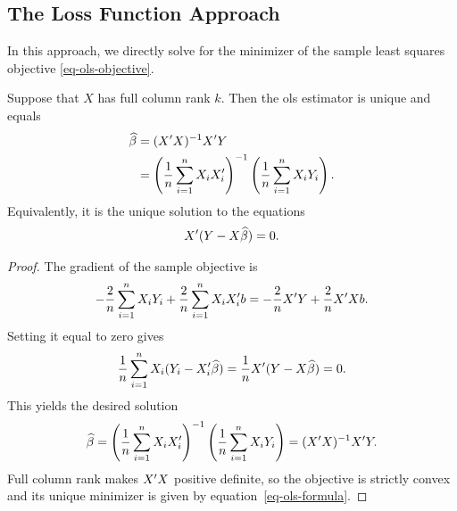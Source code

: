 \documentclass[a4paper,12pt]{article}
\begin{document}
\subsection{The Loss Function Approach}

In this approach, we directly solve for the minimizer of the sample least squares objective \eqref{eq-ols-objective}.


\begin{theorem}\label{thm-sample-least-squares}
	Suppose that $X$ has full column rank $k$.
	Then the \gls{ols} estimator is unique and equals
	\begin{align}\label{eq-ols-formula}
		\widehat\beta
		&=(X^{\prime} X)^{-1} X^{\prime} Y\\
		&=\left(\frac{1}{n}\sum_{i=1}^nX_iX_i^{\prime}\right)^{-1}
		\left(\frac{1}{n}\sum_{i=1}^nX_iY_i\right).
	\end{align}
	Equivalently, it is the unique solution to the equations
	\begin{align}\label{eq-sample-normal-equations}
		X^{\prime}(Y-X\widehat\beta)=0.
	\end{align}
\end{theorem}
\begin{proof}
	The gradient of the sample objective is
	\begin{align}
		-\frac2n \sum_{i=1}^n X_iY_i + \frac2n \sum_{i=1}^n X_iX_i^{\prime} b
		=-\frac2n X^{\prime} Y + \frac2n X^{\prime} X b.
	\end{align}
	Setting it equal to zero gives
	\begin{align}
		\frac1n \sum_{i=1}^{n} X_i(Y_i-X_i^{\prime}\widehat\beta)
		=\frac1n X^{\prime}(Y-X\widehat\beta)=0.
	\end{align}
	This yields the desired solution
	\begin{align}
		\begin{aligned}
			\widehat\beta
			=\left(\frac1n\sum_{i=1}^{n}X_iX_i^{\prime}\right)^{-1}
			\left(\frac1n\sum_{i=1}^{n}X_iY_i\right)
			=(X^{\prime} X)^{-1} X^{\prime} Y.
		\end{aligned}
	\end{align}
	Full column rank makes $X^{\prime} X$ positive definite,
	so the objective is strictly convex and its unique minimizer is given by equation~\eqref{eq-ols-formula}.
\end{proof}
\end{document}
